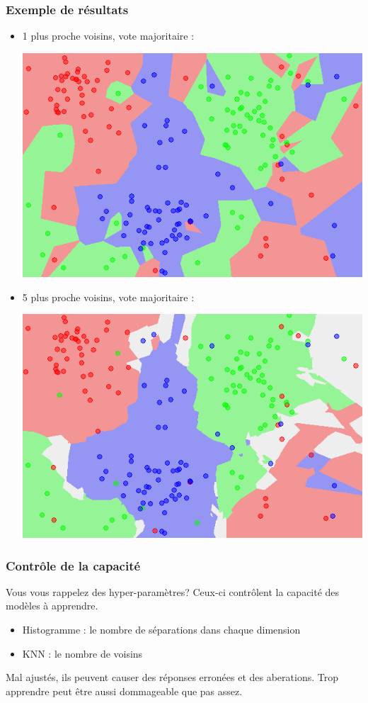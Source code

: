 \documentclass[french]{beamer}
\begin{document}
\begin{frame}
\frametitle{Exemple de résultats}
\begin{itemize}
\item 1 plus proche voisins, vote majoritaire :
\begin{center}
\includegraphics[scale=0.3]{Map1NN.png}
\end{center}

\item 5 plus proche voisins, vote majoritaire :
\begin{center}
\includegraphics[scale=0.3]{Map5NN.png}
\end{center}
\end{itemize}

\end{frame}



\begin{frame}
\frametitle{Contrôle de la capacité}
Vous vous rappelez des hyper-paramètres? Ceux-ci contrôlent la capacité des modèles à apprendre.

\begin{itemize}
\item Histogramme : le nombre de séparations dans chaque dimension
\item KNN : le nombre de voisins
\end{itemize}

Mal ajustés, ils peuvent causer des réponses erronées et des aberations. Trop apprendre peut être aussi dommageable que pas assez.
\end{frame}
\end{document}
